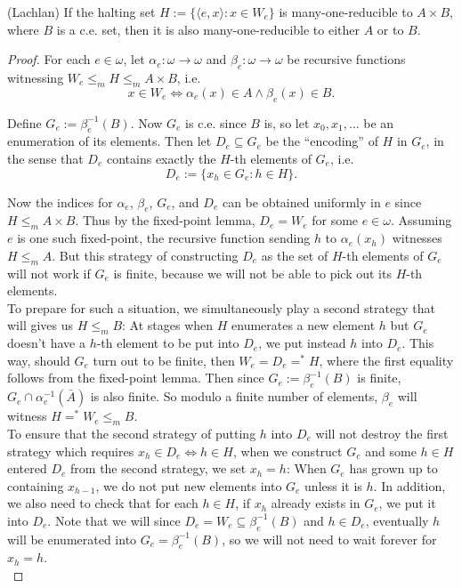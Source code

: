 \begin{theorem}
  (Lachlan) If the halting set $H:=\{\langle e,x\rangle: x\in W_e\}$ is
  many-one-reducible to $A\times B$, where $B$ is a c.e. set, then it is
  also many-one-reducible to either $A$ or to $B$.
\end{theorem}
\begin{proof}
  For each $e\in\omega$, let $\alpha_e:\omega \rightarrow\omega$ and
  $\beta_e:\omega \rightarrow\omega$ be recursive functions witnessing
  $W_e\leq_m H\leq_m A\times B$, i.e.
  \[x\in W_e \Leftrightarrow \alpha_e(x)\in A \wedge \beta_e(x)\in B.\]

  Define $G_e:=\beta_e^{-1}(B)$. Now $G_e$ is c.e. since $B$ is, so let
  $x_0,x_1,\ldots$ be an enumeration of its elements. Then let
  $D_e\subseteq G_e$ be the ``encoding'' of $H$ in $G_e$, in the sense that
  $D_e$ contains exactly the $H$-th elements of $G_e$, i.e.
  \[D_e :=\{x_h\in G_e: h\in H\}.\]

  Now the indices for $\alpha_e$, $\beta_e$, $G_e$, and $D_e$ can be
  obtained uniformly in $e$ since $H\leq_m A\times B$. Thus by the
  fixed-point lemma, $D_e=W_e$ for some $e\in\omega$. Assuming $e$ is one
  such fixed-point, the recursive function sending $h$ to $\alpha_e(x_h)$
  witnesses $H\leq_m A$. But this strategy of constructing $D_e$ as the set
  of $H$-th elements of $G_e$ will not work if $G_e$ is finite, because we
  will not be able to pick out its $H$-th elements.\\

  To prepare for such a situation, we simultaneously play a second strategy
  that will gives us $H\leq_m B$: At stages when $H$ enumerates a new
  element $h$ but $G_e$ doesn't have a $h$-th element to be put into
  $D_e$, we put instead $h$ into $D_e$. This way, should $G_e$ turn out to
  be finite, then $W_e=D_e=^*H$, where the first equality follows from the
  fixed-point lemma. Then since $G_e:=\beta_e^{-1}(B)$ is finite,
  $G_e\cap \alpha_e^{-1}(\bar{A})$ is also finite. So modulo a finite
  number of elements, $\beta_e$ will witness $H=^*W_e\leq_m B$.\\

  To ensure that the second strategy of putting $h$ into $D_e$ will not
  destroy the first strategy which requires $x_h\in D_e \Leftrightarrow
  h\in H$, when we construct $G_e$ and some $h\in H$ entered $D_e$ from
  the second strategy, we set $x_h=h$: When $G_e$ has grown up to
  containing $x_{h-1}$, we do not put new elements into $G_e$ unless it is
  $h$. In addition, we also need to check that for each $h\in H$, if $x_h$
  already exists in $G_e$, we put it into $D_e$. Note that we will since
  $D_e=W_e\subseteq\beta_e^{-1}(B)$ and $h\in D_e$, eventually $h$ will be
  enumerated into $G_e=\beta_e^{-1}(B)$, so we will not need to wait
  forever for $x_h=h$. \\


\end{proof}
